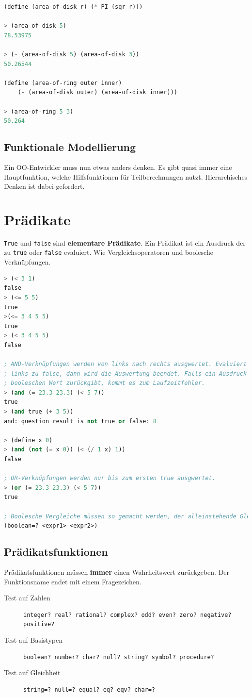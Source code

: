 \begin{lstlisting}[language=Lisp, caption=Beispiel Funktionen]
(define (area-of-disk r) (* PI (sqr r)))

> (area-of-disk 5)
78.53975

> (- (area-of-disk 5) (area-of-disk 3))
50.26544

(define (area-of-ring outer inner)
	(- (area-of-disk outer) (area-of-disk inner)))

> (area-of-ring 5 3)
50.264
\end{lstlisting}

\subsection{Funktionale Modellierung}
Ein OO-Entwickler muss nun etwas anders denken. Es gibt quasi immer eine Hauptfunktion, welche Hilfsfunktionen für Teilberechnungen nutzt. Hierarchisches Denken ist dabei gefordert.

\section{Prädikate}
\verb|True| und \verb|false| sind \textbf{elementare Prädikate}. Ein Prädikat ist ein Ausdruck der zu \verb|true| oder \verb|false| evaluiert. Wie Vergleichsoperatoren und boolesche Verknüpfungen.
\begin{lstlisting}[language=Lisp, caption=Prädikate]
> (< 3 1)
false
> (<= 5 5)
true
>(<= 3 4 5 5)
true
> (< 3 4 5 5)
false

; AND-Verknüpfungen werden von links nach rechts ausgwertet. Evaluiert ein Ausdruck 
; links zu false, dann wird die Auswertung beendet. Falls ein Ausdruck keinen 
; booleschen Wert zurückgibt, kommt es zum Laufzeitfehler.
> (and (= 23.3 23.3) (< 5 7))
true
> (and true (+ 3 5))
and: question result is not true or false: 8

> (define x 0)
> (and (not (= x 0)) (< (/ 1 x) 1))
false

; OR-Verknüpfungen werden nur bis zum ersten true ausgwertet.
> (or (= 23.3 23.3) (< 5 7))
true

; Boolesche Vergleiche müssen so gemacht werden, der alleinstehende Gleich-Operator ist nur für Zahlen!
(boolean=? <expr1> <expr2>)
\end{lstlisting}

\subsection{Prädikatsfunktionen}
Prädikatsfunktionen müssen \textbf{immer} einen Wahrheitswert zurückgeben. Der Funktionsname endet mit einem Fragezeichen.
\begin{description}
	\item[Test auf Zahlen] \verb|integer? real? rational? complex? odd? even? zero? negative? positive?|
	\item[Test auf Basistypen] \verb|boolean? number? char? null? string? symbol? procedure?|
	\item[Test auf Gleichheit] \verb|string=? null=? equal? eq? eqv? char=?|
\end{description}

